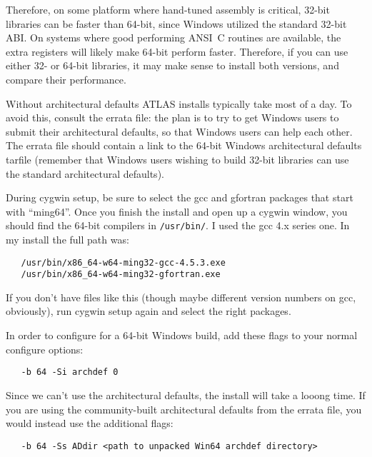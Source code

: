 \documentclass[11pt]{article}
\newcommand{\Wskip}[1]{ }
\begin{document}
Therefore, on some platform where hand-tuned assembly is
critical, 32-bit libraries can be faster than 64-bit, since Windows
utilized the standard 32-bit ABI.  On systems where good performing 
ANSI~C routines are available, the extra registers will likely make 64-bit
perform faster.  Therefore, if you can use either 32- or 64-bit libraries,
it may make sense to install both versions, and compare their performance.

Without architectural defaults ATLAS installs
typically take most of a day.  To avoid this, consult the errata file:
the plan is to try to get Windows users to submit their architectural
defaults, so that Windows users can help each other.  The errata file
should contain a link to the 64-bit Windows architectural defaults tarfile
(remember that Windows users wishing to build 32-bit libraries can
use the standard architectural defaults).

During cygwin setup, be sure
to select the gcc and gfortran packages that start with ``ming64''.
Once you finish the install and open up a cygwin window, you should
find the 64-bit compilers in \texttt{/usr/bin/}.  I used the gcc 4.x
series one.  In my install the full path was:
\begin{verbatim}
   /usr/bin/x86_64-w64-ming32-gcc-4.5.3.exe
   /usr/bin/x86_64-w64-ming32-gfortran.exe
\end{verbatim}

If you don't have files like this (though maybe different version numbers
on gcc, obviously), run cygwin setup again and select the right packages.

\Wskip{
Once these packages exist in \texttt{/usr/bin} (any version number is
OK on the gcc executable, as is no number at all), then the next step
is to change your path so that cygwin can find the 64-bit MinGW dlls,
which you can do with:
\begin{verbatim}
   export PATH=/usr/i686-w64-mingw32/sys-root/mingw/bin:$PATH
\end{verbatim}
}

In order to configure for a 64-bit Windows build, add these flags to your
normal configure options:
\begin{verbatim}
   -b 64 -Si archdef 0
\end{verbatim}
Since we can't use the architectural defaults, the install will take
a looong time.  If you are using the community-built architectural defaults
from the errata file, you would instead use the additional flags:
\begin{verbatim}
   -b 64 -Ss ADdir <path to unpacked Win64 archdef directory>
\end{verbatim}
\end{document}
